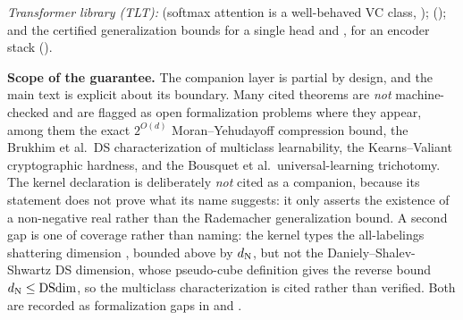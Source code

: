 \smallskip
\noindent\emph{Transformer library (TLT):}
 (softmax attention is a well-behaved VC
class, ); 
(); and the certified generalization bounds
 for a single head and
,  for an
encoder stack ().

\smallskip
\noindent\textbf{Scope of the guarantee.}  The companion layer is partial by
design, and the main text is explicit about its boundary.  Many cited theorems
are \emph{not} machine-checked and are flagged as open formalization problems
where they appear, among them the exact $2^{O(d)}$ Moran--Yehudayoff
compression bound, the Brukhim et al.\ DS characterization of multiclass
learnability, the Kearns--Valiant cryptographic hardness, and the Bousquet et
al.\ universal-learning trichotomy.  The kernel declaration  is deliberately
\emph{not} cited as a companion, because its statement does not prove what its
name suggests: it only asserts the existence of a non-negative real rather than
the Rademacher generalization bound.  A second gap is one of coverage rather
than naming: the kernel types the all-labelings shattering dimension
, bounded above
by $d_{\mathrm{N}}$, but not the Daniely--Shalev-Shwartz DS dimension, whose pseudo-cube
definition gives the reverse bound $d_{\mathrm{N}} \le \mathrm{DSdim}$, so the multiclass
characterization is cited rather than verified.  Both are recorded as
formalization gaps in  and .
\par\endgroup

